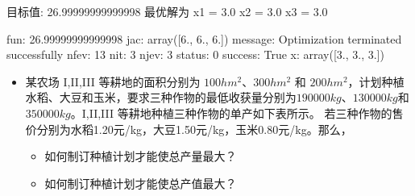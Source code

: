 \documentclass[letterpaper,10pt,english]{sphinxmanual}
\begin{document}
\begin{sphinxVerbatim}[commandchars=\\\{\}]
  

  
  \PYG{p}{[}\PYG{p}{]}
  \PYG{p}{[}\PYG{p}{]}
  \PYG{p}{[}\PYG{p}{]}
\end{sphinxVerbatim}

\begin{sphinxVerbatim}[commandchars=\\\{\}]
目标值: 26.99999999999998
最优解为
x1 = 3.0
x2 = 3.0
x3 = 3.0
\end{sphinxVerbatim}

\begin{sphinxVerbatim}[commandchars=\\\{\}]
     fun: 26.99999999999998
     jac: array([6., 6., 6.])
 message: \PYGZsq{}Optimization terminated successfully\PYGZsq{}
    nfev: 13
     nit: 3
    njev: 3
  status: 0
 success: True
       x: array([3., 3., 3.])
\end{sphinxVerbatim}
\begin{itemize}
\item {} 
某农场 I,II,III 等耕地的面积分别为 \(100 hm^2\)、\(300 hm^2\) 和 \(200 hm^2\)，计划种植水稻、大豆和玉米，要求三种作物的最低收获量分别为\(190000kg\)、\(130000kg\)和\(350000kg\)。I,II,III 等耕地种植三种作物的单产如下表所示。
若三种作物的售价分别为水稻1.20元/kg，大豆1.50元/kg，玉米0.80元/kg。那么，
\begin{itemize}
\item {} 
如何制订种植计划才能使总产量最大？

\item {} 
如何制订种植计划才能使总产值最大？

\end{itemize}

\end{itemize}
\end{document}
